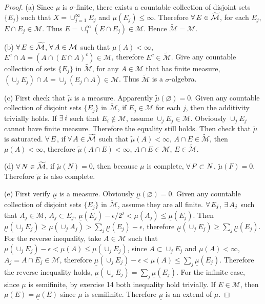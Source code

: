 \begin{proof}
    (a) Since $\mu$ is $\sigma$-finite, there exists a countable collection of disjoint sets $\{E_j\}$ such that $X=\cup^\infty_{j=1}E_j$ and $\mu(E_j)\le\infty$. Therefore $\forall\, E\in\widetilde{\mathcal{M}}$, for each $E_j$, $E\cap E_j\in\mathcal{M}$. Thus $E=\cup_1^\infty(E\cap E_j)\in\mathcal{M}$. Hence $\widetilde{\mathcal{M}}=\mathcal{M}$.
    \par(b) $\forall\, E\in\widetilde{\mathcal{M}}$, $\forall\, A\in\mathcal{M}$ such that $\mu(A)<\infty$, $E^c\cap A=(A\cap(E\cap A)^c)\in\mathcal{M}$, therefore $E^c\in\widetilde{\mathcal{M}}$. Give any countable collection of sets $\{E_j\}$ in $\widetilde{\mathcal{M}}$, for any $A\in\mathcal{M}$ that has finite measure, $(\cup_j E_j)\cap A=\cup_j(E_j\cap A)\in\mathcal{M}$. Thus $\widetilde{\mathcal{M}}$ is a $\sigma$-algebra.
    \par(c) First check that $\widetilde{\mu}$ is a measure. Apparently $\widetilde{\mu}(\varnothing)=0$. Given any countable collection of disjoint sets $\{E_j\}$ in $\widetilde{\mathcal{M}}$, if $E_j\in\mathcal{M}$ for each $j$, then the additivity trivially holds. If $\exists\, i$ such that $E_i\not\in\mathcal{M}$, assume $\cup_jE_j\in\mathcal{M}$. Obviously $\cup_jE_j$ cannot have finite measure. Therefore the equality still holds. Then check that $\widetilde{\mu}$ is saturated. $\forall\, E$, if $\forall\, A\in\widetilde{\mathcal{M}}$ such that $\widetilde{\mu}(A)<\infty$, $A\cap E\in\widetilde{\mathcal{M}}$, then $\mu(A)<\infty$, therefore $\widetilde{\mu}(A\cap E)<\infty$, $A\cap E\in\mathcal{M}$, $E\in\widetilde{\mathcal{M}}$.
    \par(d) $\forall\, N\in\widetilde{\mathcal{M}}$, if $\widetilde{\mu}(N)=0$, then because $\mu$ is complete, $\forall\, F\subset N$, $\widetilde{\mu}(F)=0$. Therefore $\widetilde{\mu}$ is also complete.
    \par(e) First verify $\underline{\mu}$ is a measure. Obviously $\underline{\mu}(\varnothing)=0$. Given any countable collection of disjoint sets $\{E_j\}$ in $\widetilde{\mathcal{M}}$, assume they are all finite. $\forall\, E_j$, $\exists\, A_j$ such that $A_j\in\mathcal{M}$, $A_j\subset E_j$, $\underline{\mu}(E_j)-\epsilon/2^j<\mu(A_j)\le\underline{\mu}(E_j)$. Then $\underline{\mu}(\cup_jE_j)\ge\mu(\cup_jA_j)>\sum_j\underline{\mu}(E_j)-\epsilon$, therefore $\underline{\mu}(\cup_jE_j)\ge\sum_j\underline{\mu}(E_j)$. For the reverse inequality, take $A\in\mathcal{M}$ such that $\underline{\mu}(\cup_jE_j)-\epsilon<\mu(A)\le\underline{\mu}(\cup_jE_j)$, since $A\subset \cup_jE_j$ and $\mu(A)<\infty$, $A_j=A\cap E_j\in\mathcal{M}$, therefore $\underline{\mu}(\cup_jE_j)-\epsilon<\mu(A)\le\sum_j\underline{\mu}(E_j)$. Therefore the reverse inequality holds, $\underline{\mu}(\cup_jE_j)=\sum_j\underline{\mu}(E_j)$. For the infinite case, since $\mu$ is semifinite, by exercise 14 both inequality hold trivially. If $E\in\mathcal{M}$, then $\mu(E)=\underline{\mu}(E)$ since $\mu$ is semifinite. Therefore $\underline{\mu}$ is an extend of $\mu$.

\end{proof}
